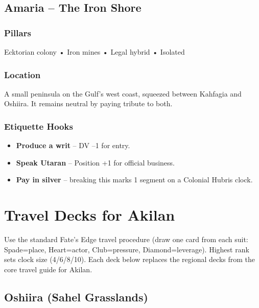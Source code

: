 \documentclass[11pt]{book}
\begin{document}
\section{Amaria -- The Iron Shore}

\subsection*{Pillars}
Ecktorian colony • Iron mines • Legal hybrid • Isolated

\subsection*{Location}
A small peninsula on the Gulf's west coast, squeezed between Kahfagia and Oshiira. It remains neutral by paying tribute to both.

\subsection*{Etiquette Hooks}
\begin{itemize}
\item \textbf{Produce a writ} -- DV --1 for entry.
\item \textbf{Speak Utaran} -- Position +1 for official business.
\item \textbf{Pay in silver} -- breaking this marks 1 segment on a Colonial Hubris clock.
\end{itemize}

\chapter{Travel Decks for Akilan}

Use the standard Fate's Edge travel procedure (draw one card from each suit: Spade=place, Heart=actor, Club=pressure, Diamond=leverage). Highest rank sets clock size (4/6/8/10). Each deck below replaces the regional decks from the core travel guide for Akilan.

\section{Oshiira (Sahel Grasslands)}
\end{document}
